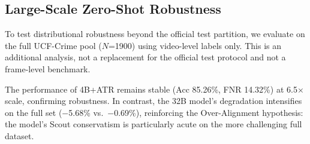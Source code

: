 \subsection{Large-Scale Zero-Shot Robustness}
\label{sec:robustness}

To test distributional robustness beyond the official test partition, we evaluate on the full UCF-Crime pool ($N$=1900) using video-level labels only. This is an additional analysis, not a replacement for the official test protocol and not a frame-level benchmark.

\begin{table}[t]
  \centering
  \caption{Standard test set ($N$=290) vs.\ full dataset pool ($N$=1900): key configurations.}
  \label{tab:robustness}
\end{table}

The performance of 4B+ATR remains stable (Acc 85.26\%, FNR 14.32\%) at 6.5$\times$ scale, confirming robustness. In contrast, the 32B model's degradation intensifies on the full set ($-$5.68\% vs.\ $-$0.69\%), reinforcing the Over-Alignment hypothesis: the model's Scout conservatism is particularly acute on the more challenging full dataset.


